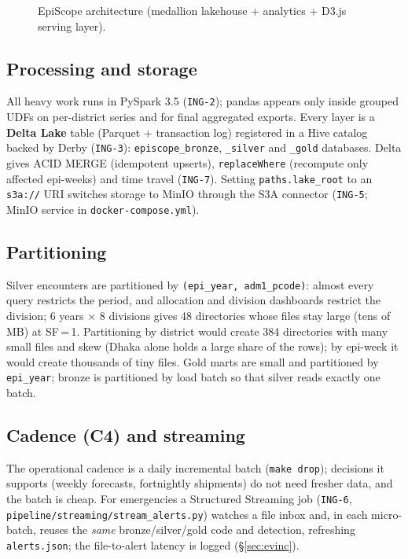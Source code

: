 \documentclass[conference]{IEEEtran}
\newcommand{\req}[1]{\texttt{#1}}
\begin{document}
\begin{figure}[t]
\caption{EpiScope architecture (medallion lakehouse + analytics + D3.js serving layer).}\label{fig:arch}
\end{figure}

\subsection{Processing and storage}
All heavy work runs in PySpark 3.5 (\req{ING-2}); pandas appears only inside grouped UDFs on
per-district series and for final aggregated exports. Every layer is a \textbf{Delta Lake} table (Parquet
+ transaction log) registered in a Hive catalog backed by Derby (\req{ING-3}): \texttt{episcope\_bronze},
\texttt{\_silver} and \texttt{\_gold} databases. Delta gives ACID MERGE (idempotent upserts), \texttt{replaceWhere}
(recompute only affected epi-weeks) and time travel (\req{ING-7}). Setting \texttt{paths.lake\_root} to an
\texttt{s3a://} URI switches storage to MinIO through the S3A connector (\req{ING-5}; MinIO service in
\texttt{docker-compose.yml}).

\subsection{Partitioning}
Silver encounters are partitioned by \texttt{(epi\_year, adm1\_pcode)}: almost every query restricts the
period, and allocation and division dashboards restrict the division; 6 years $\times$ 8 divisions gives 48
directories whose files stay large (tens of MB) at SF\,=\,1. Partitioning by district would create 384
directories with many small files and skew (Dhaka alone holds a large share of the rows); by epi-week it
would create thousands of tiny files. Gold marts are small and partitioned by \texttt{epi\_year}; bronze is
partitioned by load batch so that silver reads exactly one batch.

\subsection{Cadence (C4) and streaming}\label{sec:cadence}
The operational cadence is a daily incremental batch (\texttt{make drop}); decisions it supports (weekly
forecasts, fortnightly shipments) do not need fresher data, and the batch is cheap. For emergencies a
Structured Streaming job (\req{ING-6}, \texttt{pipeline/streaming/stream\_alerts.py}) watches a file inbox and,
in each micro-batch, reuses the \emph{same} bronze/silver/gold code and detection, refreshing
\texttt{alerts.json}; the file-to-alert latency is logged (\S\ref{sec:evinc}).
\end{document}
